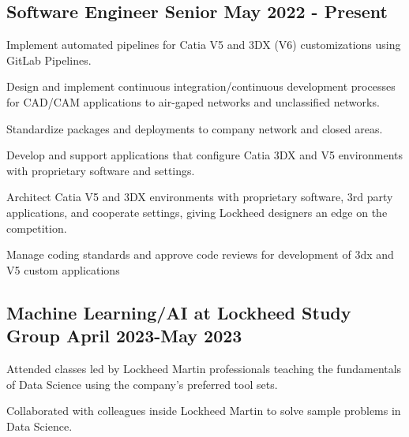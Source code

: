 \subsection{{Software Engineer Senior \hfill May 2022 - Present}}
\begin{zitemize}
\item Implement automated pipelines for Catia V5 and 3DX (V6) customizations using GitLab Pipelines.
\item Design and implement continuous integration/continuous development  processes for CAD/CAM applications to air-gaped networks and unclassified networks.\\
\item Standardize packages and deployments to company network and closed areas.
\item Develop and support applications that configure Catia 3DX and V5 environments with proprietary software and settings.
\item Architect Catia V5 and 3DX environments with proprietary software, 3rd party applications, and cooperate settings, giving Lockheed designers an edge on the competition. 
\item Manage coding standards and approve code reviews for development of 3dx and V5 custom applications\\
\end{zitemize}

\subsection{{Machine Learning/AI at Lockheed Study Group \hfill April 2023-May 2023}}
\begin{zitemize}
\item Attended classes led by Lockheed Martin professionals teaching the fundamentals of Data Science using the company's preferred tool sets.
\item Collaborated with colleagues inside Lockheed Martin to solve sample problems in Data Science.
\end{zitemize}

